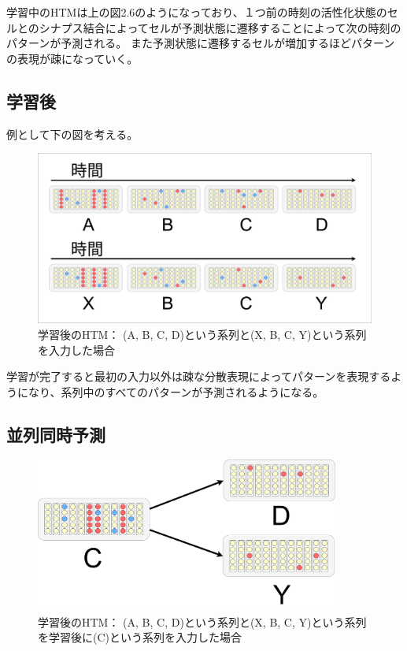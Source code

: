 学習中のHTMは上の図2.6のようになっており、１つ前の時刻の活性化状態のセルとのシナプス結合によってセルが予測状態に遷移することによって次の時刻のパターンが予測される。
また予測状態に遷移するセルが増加するほどパターンの表現が疎になっていく。

\subsection{学習後}
例として下の図を考える。

\begin{figure}[ht]
  \begin{center}
    \includegraphics[width=14cm]{./fig/drawing_6}
    \caption{学習後のHTM： (A, B, C, D)という系列と(X, B, C, Y)という系列を入力した場合}
    \label{fig:HTM_after_learning}
  \end{center}
\end{figure}

学習が完了すると最初の入力以外は疎な分散表現によってパターンを表現するようになり、系列中のすべてのパターンが予測されるようになる。

\newpage
\subsection{並列同時予測}

\begin{figure}[ht]
  \begin{center}
    \includegraphics[width=10cm]{./fig/drawing_8}
    \caption{学習後のHTM： (A, B, C, D)という系列と(X, B, C, Y)という系列を学習後に(C)という系列を入力した場合}
    \label{fig:HTM_parallel_prediction}
  \end{center}
\end{figure}

